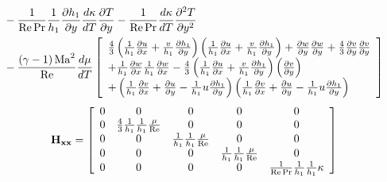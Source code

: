 \begin{align*}
  &- \frac{1}{{{\mathop{\rm Re}\nolimits} \Pr }}\frac{1}{{h_1 }}\frac{{\partial h_1 }}{{\partial y}}\frac{{d\kappa }}{{dT}}\frac{{\partial T}}{{\partial y}} - \frac{1}{{{\mathop{\rm Re}\nolimits} \Pr }}\frac{{d\kappa }}{{dT}}\frac{{\partial ^2 T}}{{\partial y^2 }}\\
  & - \frac{{\left( {\gamma  - 1} \right){\rm{Ma}}^2 }}{{{\mathop{\rm Re}\nolimits} }}\frac{{d\mu }}{{dT}}\left[ \begin{array}{l}
 \frac{{\rm{4}}}{3}\left( {\frac{1}{{h_1 }}\frac{{\partial u}}{{\partial x}} + \frac{v}{{h_1 }}\frac{{\partial h_1 }}{{\partial y}}} \right)\left( {\frac{1}{{h_1 }}\frac{{\partial u}}{{\partial x}} + \frac{v}{{h_1 }}\frac{{\partial h_1 }}{{\partial y}}} \right) + \frac{{\partial w}}{{\partial y}}\frac{{\partial w}}{{\partial y}} + \frac{{\rm{4}}}{3}\frac{{\partial v}}{{\partial y}}\frac{{\partial v}}{{\partial y}} \\
 {\rm{ + }}\frac{1}{{h_1 }}\frac{{\partial w}}{{\partial x}}\frac{1}{{h_1 }}\frac{{\partial w}}{{\partial x}} - \frac{{\rm{4}}}{3}\left( {\frac{1}{{h_1 }}\frac{{\partial u}}{{\partial x}} + \frac{v}{{h_1 }}\frac{{\partial h_1 }}{{\partial y}}} \right)\left( {\frac{{\partial v}}{{\partial y}}} \right) \\
  + \left( {\frac{1}{{h_1 }}\frac{{\partial v}}{{\partial x}} + \frac{{\partial u}}{{\partial y}} - \frac{1}{{h_1 }}u\frac{{\partial h_1 }}{{\partial y}}} \right)\left( {\frac{1}{{h_1 }}\frac{{\partial v}}{{\partial x}} + \frac{{\partial u}}{{\partial y}} - \frac{1}{{h_1 }}u\frac{{\partial h_1 }}{{\partial y}}} \right) \\
 \end{array} \right]
\end{align*}
\begin{equation*}
  {\bf{H}}_{{\bf{xx}}}  = \left[ {\begin{array}{*{20}c}
   0 & 0 & 0 & 0 & 0  \\
   0 & {\frac{4}{3}\frac{1}{{h_1 }}\frac{1}{{h_1 }}\frac{\mu }{{{\mathop{\rm Re}\nolimits} }}} & 0 & 0 & 0  \\
   0 & 0 & {\frac{1}{{h_1 }}\frac{1}{{h_1 }}\frac{\mu }{{{\mathop{\rm Re}\nolimits} }}} & 0 & 0  \\
   0 & 0 & 0 & {\frac{1}{{h_1 }}\frac{1}{{h_1 }}\frac{\mu }{{{\mathop{\rm Re}\nolimits} }}} & 0  \\
   0 & 0 & 0 & 0 & {\frac{1}{{{\mathop{\rm Re}\nolimits} \Pr }}\frac{1}{{h_1 }}\frac{1}{{h_1 }}\kappa }  \\
\end{array}} \right]
\end{equation*}
